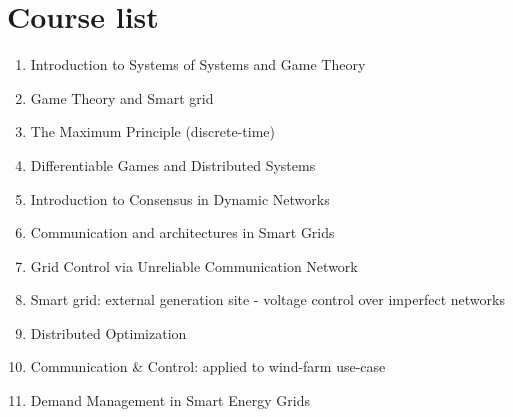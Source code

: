 \chapter*{Course list} %
\begin{enumerate}
        \item Introduction to Systems of Systems and Game Theory
        \item Game Theory and Smart grid
        \item The Maximum Principle (discrete-time)
        \item Differentiable Games and Distributed Systems
        \item Introduction to Consensus in Dynamic Networks
        \item Communication and architectures in Smart Grids
        \item Grid Control via Unreliable Communication Network
        \item Smart grid: external generation site - voltage control over imperfect networks
        \item Distributed Optimization
        \item Communication \& Control: applied to wind-farm use-case
        \item Demand Management in Smart Energy Grids
\end{enumerate}


